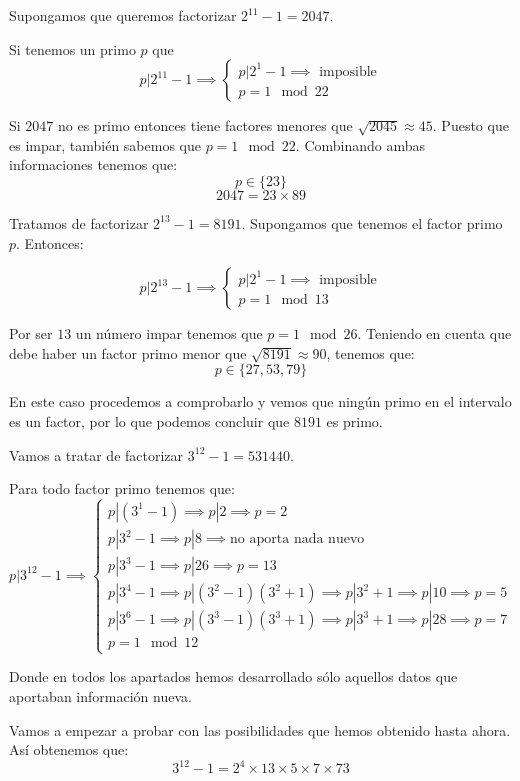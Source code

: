 \begin{example}
Supongamos que queremos factorizar $2^{11}-1=2047$.

Si tenemos un primo $p$ que
\[p|2^{11}-1\implies \left\{ \begin{array}{l}p|2^1-1 \implies \text{ imposible}\\ p =1 \mod 22 \end{array}\right.\]

Si $2047$ no es primo entonces tiene factores menores que $\sqrt{2045}\approx 45$. Puesto que es impar, también sabemos que $p=1 \mod 22$. Combinando ambas informaciones tenemos que:
\[p \in \{23 \}\]
\[2047 = 23 \times 89\]
\end{example}

\begin{example}
Tratamos de factorizar $2^{13}-1=8191$. Supongamos que tenemos el factor primo $p$. Entonces:

\[p|2^{13}-1\implies \left\{ \begin{array}{l}p|2^1-1 \implies \text{ imposible}\\ p =1 \mod 13 \end{array}\right.\]

Por ser $13$ un número impar tenemos que $p = 1 \mod 26$. Teniendo en cuenta que debe haber un factor primo menor que $\sqrt{8191}\approx 90$, tenemos que:
\[p \in \{27,53,79\}\]

En este caso procedemos a comprobarlo y vemos que ningún primo en el intervalo es un factor, por lo que podemos concluir que $8191$ es primo.
\end{example}

\begin{example}
Vamos a tratar de factorizar $3^{12}-1 = 531440$.

Para todo factor primo tenemos que:
\[p|3^{12}-1 \implies \left\{ \begin{array}{l}p|(3^1-1) \implies p|2 \implies p=2\\
p|3^2-1 \implies p|8 \implies \text{no aporta nada nuevo}\\
p|3^3-1 \implies p |26 \implies  p=13\\
p|3^4-1 \implies p |(3^2-1)(3^2+1) \implies p|3^2+1 \implies p|10 \implies p=5\\
p|3^6-1 \implies p |(3^3-1)(3^3+1) \implies p|3^3+1 \implies p|28 \implies p=7\\
p =1 \mod 12 \end{array}\right.\]

Donde en todos los apartados hemos desarrollado sólo aquellos datos que aportaban información nueva.

Vamos a empezar a probar con las posibilidades que hemos obtenido hasta ahora. Así obtenemos que:
\[3^{12}-1 = 2^4\times 13 \times 5 \times 7 \times 73\]

\end{example}

